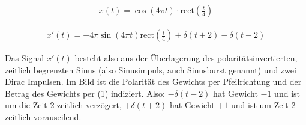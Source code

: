 \begin{Loesung}

\begin{align}
x(t) = \cos(4\pi t) \cdot \mathrm{rect}(\frac{t}{4})
\end{align}

\begin{align}x'(t)=
- 4\pi\sin(4\pi t) \mathrm{rect}(\frac{t}{4})
+ \delta(t+2)
- \delta(t-2)
\end{align}

\begin{center}
\end{center}

Das Signal $x'(t)$ besteht also aus der Überlagerung des polaritätsinvertierten,
zeitlich begrenzten Sinus (also Sinusimpuls, auch
Sinusburst genannt) und zwei Dirac Impulsen. Im Bild ist die
Polarität des Gewichts per Pfeilrichtung und der Betrag des Gewichts per (1)
indiziert. Also: $-\delta(t-2)$ hat Gewicht $-1$ und ist um die Zeit 2 zeitlich
verzögert,
$+\delta(t+2)$ hat Gewicht $+1$ und ist um Zeit 2 zeitlich vorauseilend.
\end{Loesung}

\newpage
